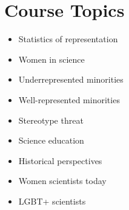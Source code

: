 \documentclass{article}
\begin{document}
\section{Course Topics}
\begin{itemize}
\item Statistics of representation
\item Women in science
\item Underrepresented minorities
\item Well-represented minorities
\item Stereotype threat
\item Science education
\item Historical perspectives
\item Women scientists today
\item LGBT+ scientists
\end{itemize}
\end{document}

